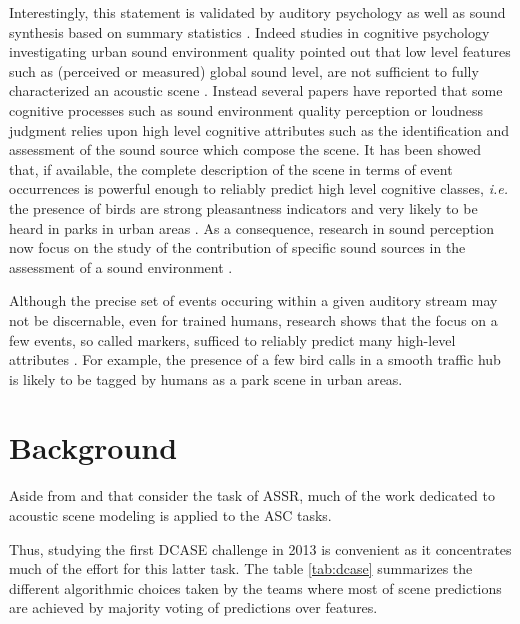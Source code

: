 \documentclass[journal]{IEEEtran}
\begin{document}
Interestingly, this statement is validated by auditory psychology as well as sound synthesis based  on summary statistics \cite{mcdermott2013summary}. Indeed studies in cognitive psychology investigating urban sound environment quality pointed out that low level features such as (perceived or measured) global sound level, are not sufficient to fully characterized an acoustic scene \cite{guyot2005urban,kang2006urban}. Instead several papers have reported that some cognitive processes such as sound environment quality perception \cite{dubois2006cognitive} or loudness judgment \cite{kuwano_memory_2003}  relies upon high level cognitive attributes such as the identification and assessment of the sound source which compose the scene. It has been showed that, if available, the complete description of the scene in terms of event occurrences is powerful enough to reliably predict high level cognitive classes, \textit{i.e.} the presence of birds are strong pleasantness indicators and very likely to be heard in parks in urban areas \cite{lafay:hal-01111782}. As a consequence, research in sound perception now focus on the study of the contribution of specific sound sources in the assessment of a sound environment \cite{ricciardi2015sound,lavandier2006contribution}. 

Although the precise set of events occuring within a given auditory stream may not be discernable, even for trained humans, research shows that the focus on a few events, so called markers,  sufficed to reliably predict many high-level attributes \cite{lafayPartI}.
For example, the presence of a few bird calls in a smooth traffic hub is likely to be tagged by humans as a park scene in urban areas.





\section{Background} \label{sec:soa}

Aside from \cite{aucouturier2007bag} and \cite{lagrange:hal-01082501} that consider the task of ASSR, much of the work dedicated to acoustic scene modeling is applied to the ASC tasks.

Thus, studying the first DCASE challenge \cite{barchiesi2015acoustic} in 2013 is convenient as it concentrates much of the effort for this latter task. The table \ref{tab:dcase} summarizes the different algorithmic choices taken by the teams where most of scene predictions are achieved by majority voting of predictions over features.
\end{document}
